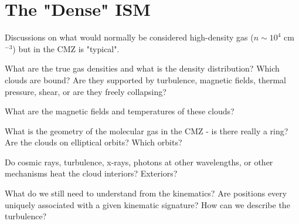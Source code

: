\section{The "Dense" ISM}
Discussions on what would normally be considered high-density gas ($n\sim10^4$ cm$^{-3}$) but in the CMZ is "typical".

What are the true gas densities and what is the density distribution?  Which clouds are bound?  Are they supported by turbulence, magnetic fields, thermal pressure, shear, or are they freely collapsing?

What are the magnetic fields and temperatures of these clouds?

What is the geometry of the molecular gas in the CMZ - is there really a ring?  Are the clouds on elliptical orbits?  Which orbits?

Do cosmic rays, turbulence, x-rays, photons at other wavelengths, or other mechanisms heat the cloud interiors?  Exteriors?

What do we still need to understand from the kinematics?  Are positions every uniquely associated with a given kinematic signature?  How can we describe the turbulence?